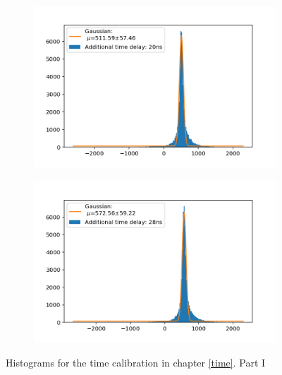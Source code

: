 \documentclass[]{article}
\begin{document}
\begin{figure}[H]
\medskip
\begin{subfigure}{0.48\textwidth}
\includegraphics[width=\linewidth]{Plots/Time/20ns.png}
\end{subfigure}
\begin{subfigure}[c]{0.48\linewidth}
\includegraphics[width=\linewidth]{Plots/Time/28ns.png}
\end{subfigure}
\caption{Histograms for the time calibration in chapter \ref{time}. Part I }
\end{figure}
\end{document}
